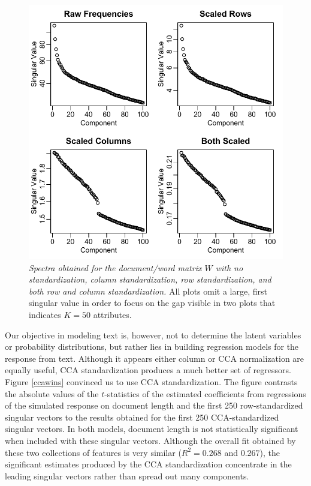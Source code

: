 \documentclass[12pt]{article}
\begin{document}
 
\begin{figure}
\caption{ \label{fig:spectra} 
{ \sl Spectra obtained for the document/word matrix $W$ with no standardization, column standardization, row standardization, and both row and column standardization.} All plots omit a large, first singular value in order to focus on the gap visible in two plots that indicates $K=50$ attributes.}
 \centerline{
 \vspace{0.1in}
 \includegraphics[width=6.0in]{figures/spectra} }
 \end{figure}

Our objective in modeling text is, however, not to determine the latent variables or probability distributions, but rather lies in building regression models for the response from text.  Although it  appears either column or CCA normalization are equally useful, CCA  standardization produces a much better set of regressors.  Figure \ref{ccawins} convinced us to use CCA standardization.  The figure contrasts the absolute values of the $t$-statistics of the estimated coefficients from regressions of the simulated response on document length and  the first 250 row-standardized singular vectors to the results obtained for the first 250 CCA-standardized singular vectors. In both models, document length is not statistically significant when included with these singular vectors.  Although the overall fit obtained by these two collections of features is very similar ($R^2 = 0.268$ and $0.267$), the significant estimates produced by the CCA standardization concentrate in the leading singular vectors rather than spread out many components.  
\end{document}
